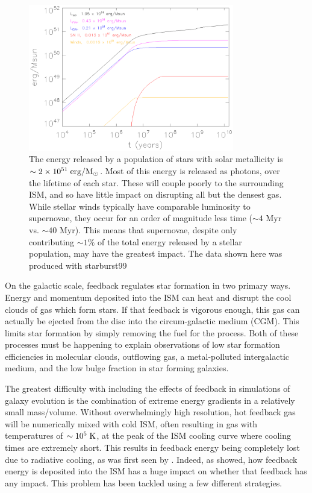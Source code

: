 \begin{figure}
    \includegraphics[width=0.8\textwidth]{FB_budget.ps}
    \caption[Stellar feedback energy budget]{The energy released by a population
    of stars with solar metallicity is $\sim 2\times10^{51}\;\rm{erg/M_\odot}$.
    Most of this energy is released as photons, over the lifetime of each star.
    These will couple poorly to the surrounding ISM, and so have little impact
    on disrupting all but the densest gas.  While stellar winds typically have
    comparable luminosity to supernovae, they occur for an order of
    magnitude less time ($\sim4$ Myr vs. $\sim40$ Myr).  This means that
    supernovae, despite only contributing $\sim1\%$ of the total energy released
    by a stellar population, may have the greatest impact.  The data shown here was
    produced with {\sc starburst99} \citep{Leitherer1999}}
\end{figure}

On the galactic scale, feedback regulates star formation in two primary ways.
Energy and momentum deposited into the ISM can heat and disrupt the cool clouds
of gas which form stars.  If that feedback is vigorous enough, this gas can
actually be ejected from the disc into the circum-galactic medium (CGM).  This
limits star formation by simply removing the fuel for the process.  Both of
these processes must be happening to explain observations of low star
formation efficiencies in molecular clouds, outflowing gas, a metal-polluted
intergalactic medium, and the low bulge fraction in star forming galaxies.

The greatest difficulty with including the effects of feedback in simulations of
galaxy evolution is the combination of extreme energy gradients in a relatively
small mass/volume.  Without overwhelmingly high resolution, hot feedback gas
will be numerically mixed with cold ISM, often resulting in gas with
temperatures of $\sim10^5\;\rm{K}$, at the peak of the ISM cooling curve where
cooling times are extremely short.  This results in feedback energy being
completely lost due to radiative cooling, as was first seen by \citet{Katz1992}.
Indeed, as \citet{Thacker2000} showed, how feedback energy is deposited into the
ISM has a huge impact on whether that feedback has any impact.  This problem has
been tackled using a few different strategies.  

